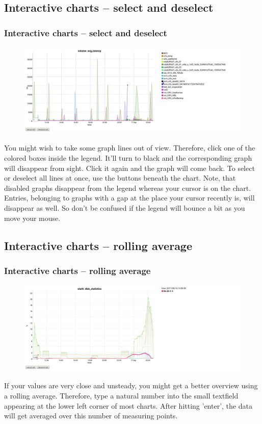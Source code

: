 \documentclass[8pt]{beamer}
\begin{document}
\subsection{Interactive charts -- select and deselect}
\begin{frame}
\frametitle{Interactive charts -- select and deselect} 
\begin{figure}
	\includegraphics[width=\textwidth]{../images/PicDat_deselect.png}
\end{figure}

You might wish to take some graph lines out of view. Therefore, click one of the colored boxes inside the legend. It'll turn to black and the corresponding graph will disappear from sight. Click it again and the graph will come back. To select or deselect all lines at once, use the buttons beneath the chart.
Note, that disabled graphs disappear from the legend whereas your cursor is on the chart. Entries, belonging to graphs with a gap at the place your cursor recently is, will disappear as well. So don't be confused if the legend will bounce a bit as you move your mouse.
\end{frame}

\subsection{Interactive charts -- rolling average}
\begin{frame}
\frametitle{Interactive charts -- rolling average} 
\begin{figure}
	\includegraphics[width=\textwidth]{../images/PicDat_roller.png}
\end{figure}

If your values are very close and unsteady, you might get a better overview using a rolling average. Therefore, type a natural number into the small textfield appearing at the lower left corner of most charts. After hitting 'enter', the data will get averaged over this number of measuring points.
\end{frame}
\end{document}
